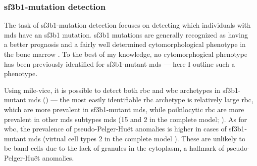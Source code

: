 \begin{figure}[!ht]
    \label{fig:wbc-disease-classification-examples}
\end{figure}

\subsubsection{\ac{sf3b1}-mutation detection} 

The task of \ac{sf3b1}-mutation detection focuses on detecting which individuals with \ac{mds} have an \ac{sf3b1} mutation. \Ac{sf3b1} mutations are generally recognized as having a better prognosis and a fairly well determined cytomorphological phenotype in the bone marrow \cite{Malcovati2020-no,Hellstrom_Lindberg2015-zs,Malcovati2015-tz}. To the best of my knowledge, no cytomorphogical phenotype has been previously identified for \ac{sf3b1}-mutant \ac{mds} --- here I outline such a phenotype. 

Using \ac{mile-vice}, it is possible to detect both \ac{rbc} and \ac{wbc} archetypes in \ac{sf3b1}-mutant \ac{mds} () --- the most easily identifiable \ac{rbc} archetype is relatively large \ac{rbc}, which are more prevalent in \ac{sf3b1}-mutant \ac{mds}, while poikilocytic \ac{rbc} are more prevalent in other \ac{mds} subtypes \ac{mds} (15 and 2 in the complete model; ). As for \ac{wbc}, the prevalence of pseudo-Pelger-Huët anomalies is higher in cases of \ac{sf3b1}-mutant \ac{mds} (virtual cell types 2 in the complete model ). These are unlikely to be band cells due to the lack of granules in the cytoplasm, a hallmark of pseudo-Pelger-Huët anomalies.

\begin{figure}[!ht]
    \label{fig:mile-vice-vcq-so-mds-classification}
\end{figure}

